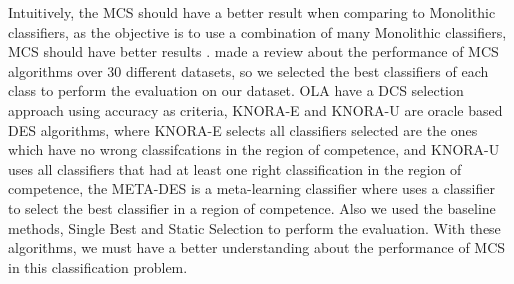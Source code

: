 Intuitively, the MCS should have a better result when comparing to Monolithic classifiers, as the objective is to use a combination of many Monolithic classifiers, MCS should have better results \citep{kuncheva2004combining}. \cite{cruz2018dynamic} made a review about the performance of MCS algorithms over 30 different datasets, so we selected the best classifiers of each class to perform the evaluation on our dataset. OLA have a DCS selection approach using accuracy as criteria, KNORA-E and KNORA-U are oracle based DES algorithms, where KNORA-E selects all classifiers selected are the ones which have no wrong classifcations in the region of competence, and KNORA-U uses all classifiers that had at least one right classification in the region of competence, the META-DES is a meta-learning classifier where uses a classifier to select the best classifier in a region of competence. Also we used the baseline methods, Single Best and Static Selection to perform the evaluation. With these algorithms, we must have a better understanding about the performance of MCS in this classification problem.

